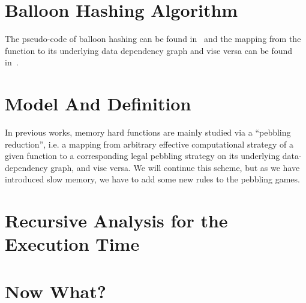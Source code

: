 \documentclass[a4paper]{article}
\begin{document}
\section{Balloon Hashing Algorithm}\label{sec::balloonHashing}
The pseudo-code of balloon hashing can be found in~\cite{corrigan2016balloon} and the mapping from the function to
its underlying data dependency graph and vise versa can be found in~\cite{dwork2005pebbling}.

\section{Model And Definition}\label{sec::model}
In previous works, memory hard functions are mainly studied via a ``pebbling reduction'', i.e. a mapping from
arbitrary effective computational strategy of a given function to a corresponding legal pebbling strategy on its
underlying data-dependency graph, and vise versa. We will continue this scheme, but as we have introduced slow
memory, we have to add some new rules to the pebbling games.

\subsection{}
\section{Recursive Analysis for the Execution Time}\label{sec::analysis}

\section{Now What?}



\end{document}
